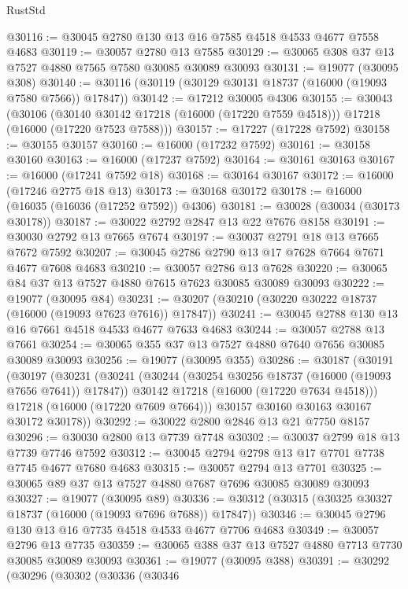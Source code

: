 \begin{lexlean}{RustStd}
\begin{coremodule}
@30116 := @30045 @2780 @130 @13 @16 @7585 @4518 @4533 @4677 @7558 @4683
@30119 := @30057 @2780 @13 @7585
@30129 := @30065 @308 @37 @13 @7527 @4880 @7565 @7580 @30085 @30089 @30093
@30131 := @19077 (@30095 @308)
@30140 := @30116 (@30119 (@30129 @30131 @18737 (@16000 (@19093 @7580 @7566)) @17847))
@30142 := @17212 @30005 @4306
@30155 := @30043
    (@30106
      (@30140 @30142 @17218 (@16000 (@17220 @7559 @4518)))
      @17218
      (@16000 (@17220 @7523 @7588)))
@30157 := @17227 (@17228 @7592)
@30158 := @30155 @30157
@30160 := @16000 (@17232 @7592)
@30161 := @30158 @30160
@30163 := @16000 (@17237 @7592)
@30164 := @30161 @30163
@30167 := @16000 (@17241 @7592 @18)
@30168 := @30164 @30167
@30172 := @16000 (@17246 @2775 @18 @13)
@30173 := @30168 @30172
@30178 := @16000 (@16035 (@16036 (@17252 @7592)) @4306)
@30181 := @30028 (@30034 (@30173 @30178))
@30187 := @30022 @2792 @2847 @13 @22 @7676 @8158
@30191 := @30030 @2792 @13 @7665 @7674
@30197 := @30037 @2791 @18 @13 @7665 @7672 @7592
@30207 := @30045 @2786 @2790 @13 @17 @7628 @7664 @7671 @4677 @7608 @4683
@30210 := @30057 @2786 @13 @7628
@30220 := @30065 @84 @37 @13 @7527 @4880 @7615 @7623 @30085 @30089 @30093
@30222 := @19077 (@30095 @84)
@30231 := @30207 (@30210 (@30220 @30222 @18737 (@16000 (@19093 @7623 @7616)) @17847))
@30241 := @30045 @2788 @130 @13 @16 @7661 @4518 @4533 @4677 @7633 @4683
@30244 := @30057 @2788 @13 @7661
@30254 := @30065 @355 @37 @13 @7527 @4880 @7640 @7656 @30085 @30089 @30093
@30256 := @19077 (@30095 @355)
@30286 := @30187
    (@30191
      (@30197
        (@30231
          (@30241
            (@30244 (@30254 @30256 @18737 (@16000 (@19093 @7656 @7641)) @17847))
            @30142
            @17218
            (@16000 (@17220 @7634 @4518)))
          @17218
          (@16000 (@17220 @7609 @7664)))
        @30157
        @30160
        @30163
        @30167
        @30172
        @30178))
@30292 := @30022 @2800 @2846 @13 @21 @7750 @8157
@30296 := @30030 @2800 @13 @7739 @7748
@30302 := @30037 @2799 @18 @13 @7739 @7746 @7592
@30312 := @30045 @2794 @2798 @13 @17 @7701 @7738 @7745 @4677 @7680 @4683
@30315 := @30057 @2794 @13 @7701
@30325 := @30065 @89 @37 @13 @7527 @4880 @7687 @7696 @30085 @30089 @30093
@30327 := @19077 (@30095 @89)
@30336 := @30312 (@30315 (@30325 @30327 @18737 (@16000 (@19093 @7696 @7688)) @17847))
@30346 := @30045 @2796 @130 @13 @16 @7735 @4518 @4533 @4677 @7706 @4683
@30349 := @30057 @2796 @13 @7735
@30359 := @30065 @388 @37 @13 @7527 @4880 @7713 @7730 @30085 @30089 @30093
@30361 := @19077 (@30095 @388)
@30391 := @30292
    (@30296
      (@30302
        (@30336
          (@30346

\end{coremodule}
\end{lexlean}
